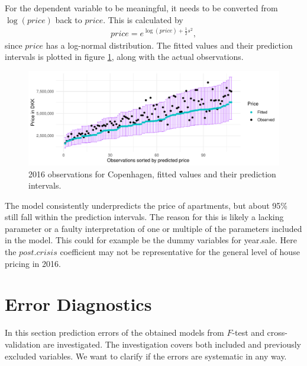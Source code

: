For the dependent variable to be meaningful, it needs to be converted from $\log(price)$ back to $price$. 
This is calculated by
\begin{align*}
    price = e^{\log(price) + \frac{1}{2} s^2},
\end{align*}
since $price$ has a log-normal distribution.  
The fitted values and their prediction intervals is plotted in figure \ref{fig:predictive_intervals_observations_fitted}, along with the actual observations. 
\begin{figure}[H]
    \centering
    \includegraphics[width = .8\textwidth]{figures/prediction_interval.pdf}
    \caption{2016 observations for Copenhagen, fitted values and their prediction intervals.}
    \label{fig:predictive_intervals_observations_fitted}
\end{figure}
The model consistently underpredicts the price of apartments, but about 95\% still fall within the prediction intervals. 
The reason for this is likely a lacking parameter or a faulty interpretation of one or multiple of the parameters included in the model. 
This could for example be the dummy variables for year.sale. 
Here the $post.crisis$ coefficient may not be representative for the general level of house pricing in 2016.






\section{Error Diagnostics}
In this section prediction errors of the obtained models from $F$-test and cross-validation are investigated. The investigation covers both included and previously excluded variables. We want to clarify if the errors are systematic in any way.

